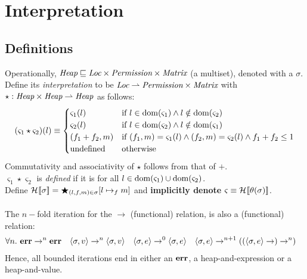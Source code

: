 \section{Interpretation}

\subsection{Definitions}


Operationally, $\emph{Heap} \sqsubseteq \emph{Loc} \times \emph{Permission}
\times \emph{Matrix} $ (a multiset), denoted with a $\sigma$.\\
Define its \emph{interpretation} to be $\emph{Loc} \rightharpoonup
\emph{Permission} \times \emph{Matrix}$ with $\star:
\emph{Heap} \times \emph{Heap} \rightharpoonup \emph{Heap}$ as follows:
\[
    (\varsigma_1 \star \varsigma_2)(l) \equiv
    \begin{cases}
        \varsigma_1(l) & \textrm{if } l \in \mathrm{dom}(\varsigma_1) \wedge l \notin \mathrm{dom}(\varsigma_2) \\
        \varsigma_2(l) & \textrm{if } l \in \mathrm{dom}(\varsigma_2) \wedge l \notin \mathrm{dom}(\varsigma_1) \\
        (f_1 + f_2, m) & \textrm{if } (f_1, m) = \varsigma_1(l) \wedge (f_2, m) = \varsigma_2(l) \wedge f_1 + f_2 \leq 1 \\
        \textrm{undefined} & \textrm{otherwise}
    \end{cases}
\]
Commutativity and associativity of $\star$ follows from that of $+$.\\
$\varsigma_1 \star \varsigma_2$ is \emph{defined} if it is for all $l \in
\mathrm{dom}(\varsigma_1) \cup \mathrm{dom}(\varsigma_2)$.\\
Define $\mathcal{H}_{} [\![ \sigma ]\!] = \bigstar_{(l,f,m) \in \sigma} [ l \mapsto_f m ]$
and \textbf{implicitly denote} $\varsigma \equiv \mathcal{H}_{} [\![ \theta(\sigma) ]\!]$.\\
\\
The $n-$fold iteration for the $\rightarrow$ (functional) relation, is also a (functional) relation:
\begin{align*}
    \forall n.\ \mathbf{err} &\rightarrow^n \mathbf{err} &
    \langle \sigma , v \rangle &\rightarrow^n \langle \sigma , v \rangle &
    \langle \sigma , e \rangle &\rightarrow^0 \langle \sigma , e \rangle &
    \langle \sigma , e \rangle &\rightarrow^{n+1} ((\langle \sigma , e \rangle \rightarrow) \rightarrow^n)
\end{align*}
Hence, all bounded iterations end in either an $\mathbf{err}$, a heap-and-expression or a
heap-and-value.

